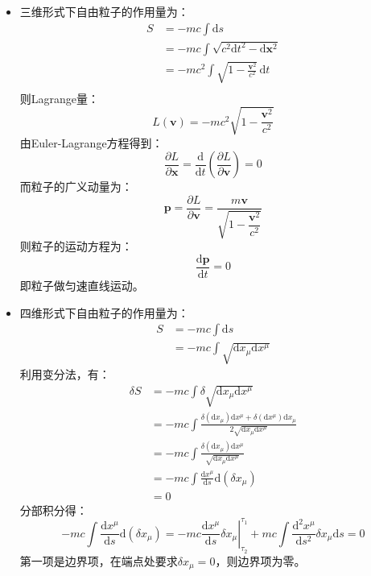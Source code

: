 \documentclass[a4paper,fontset=windows]{ctexart}
\begin{document}
\begin{itemize}
        \item[3.(a)]
        三维形式下自由粒子的作用量为：
        \begin{align*}
        S
        &= -mc\int\mathrm{d}s \\
        &= -mc\int\sqrt{c^2\mathrm{d}t^2 - \mathrm{d}\boldsymbol{x}^2} \\
        &= -mc^2\int\sqrt{1 - \frac{\boldsymbol{v}^2}{c^2}}\,\mathrm{d}t \\
        \end{align*}
        则Lagrange量：
        \[
        L(\boldsymbol{v}) = -mc^2\sqrt{1 - \frac{\boldsymbol{v}^2}{c^2}}
        \]
        由Euler-Lagrange方程得到：
        \[
        \frac{\partial L}{\partial\boldsymbol{x}} = \frac{\mathrm{d}}{\mathrm{d}t}\left(\frac{\partial L}{\partial\boldsymbol{v}}\right) = 0
        \]
        而粒子的广义动量为：
        \[
        \boldsymbol{p} = \frac{\partial L}{\partial\boldsymbol{v}} = \frac{m\boldsymbol{v}}{\sqrt{1 - \dfrac{\boldsymbol{v}^2}{c^2}}}
        \]
        则粒子的运动方程为：
        \[
        \frac{\mathrm{d}\boldsymbol{p}}{\mathrm{d}t} = 0
        \]
        即粒子做匀速直线运动。
        \medskip

        \item[3.(b)]
        四维形式下自由粒子的作用量为：
        \begin{align*}
        S
        &= -mc\int\mathrm{d}s \\
        &= -mc\int\sqrt{\mathrm{d}x_\mu\mathrm{d}x^\mu}
        \end{align*}
        利用变分法，有：
        \begin{align*}
        \delta S
        &= -mc\int\delta\sqrt{\mathrm{d}x_\mu\mathrm{d}x^\mu} \\
        &= -mc\int\frac{\delta(\mathrm{d}x_\mu)\mathrm{d}x^\mu + \delta(\mathrm{d}x^\mu)\mathrm{d}x_\mu}{2\sqrt{\mathrm{d}x_\mu\mathrm{d}x^\mu}} \\
        &= -mc\int\frac{\delta(\mathrm{d}x_\mu)\mathrm{d}x^\mu}{\sqrt{\mathrm{d}x_\mu\mathrm{d}x^\mu}} \\
        &= -mc\int\frac{\mathrm{d}x^\mu}{\mathrm{d}s}\mathrm{d}(\delta x_\mu) \\
        &= 0
        \end{align*}
        分部积分得：
        \[
        -mc\int\frac{\mathrm{d}x^\mu}{\mathrm{d}s}\mathrm{d}(\delta x_\mu)
        = \left.-mc\frac{\mathrm{d}x^\mu}{\mathrm{d}s}\delta x_\mu\right|_{\tau_2}^{\tau_1} + mc\int\frac{\mathrm{d}^2 x^\mu}{\mathrm{d}s^2}\delta x_\mu\mathrm{d}s
        = 0
        \]
        第一项是边界项，在端点处要求$\delta x_\mu = 0$，则边界项为零。


\end{itemize}
\end{document}
